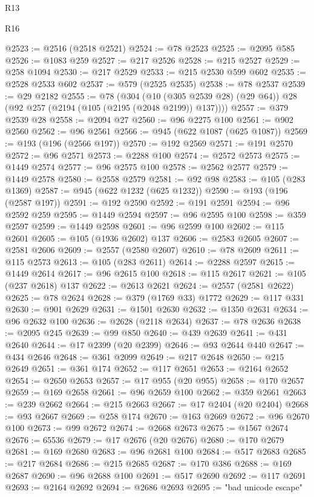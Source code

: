 \begin{lexlean}{R13}
\begin{lexlean}{R16}
\begin{coremodule}
{{{{{{{{{{{{{{{{{{{{{{{{{{{{{{{{{{{{{{{{{{{{{{{{{{{{{{{{{{{{{{{{{{{{{{{{{{{{{{{{{{{{{{{{{{{{{{{{{{{{{{{{{{{{{{{{{@2523 := @2516 (@2518 @2521)
@2524 := @78 @2523
@2525 := @2095 @585
@2526 := @1083 @259
@2527 := @217 @2526
@2528 := @215 @2527
@2529 := @258 @1094
@2530 := @217 @2529
@2533 := @215 @2530 @599 @602
@2535 := @2528 @2533 @602
@2537 := @579 (@2525 @2535)
@2538 := @78 @2537
@2539 := @29 @2182
@2555 := @78
    (@304 (@10 (@305 @2539 @28) (@29 @64)) @28 (@92 @257 (@2194 (@105 (@2195 (@2048 @2199)) @137))))
@2557 := @379 @2539 @28
@2558 := @2094 @27
@2560 := @96 @2275 @100
@2561 := @902 @2560
@2562 := @96 @2561
@2566 := @945 (@622 @1087 (@625 @1087))
@2569 := @193 (@196 (@2566 @197))
@2570 := @192 @2569
@2571 := @191 @2570
@2572 := @96 @2571
@2573 := @2288 @100
@2574 := @2572 @2573
@2575 := @1449 @2574
@2577 := @96 @2575 @100
@2578 := @2562 @2577
@2579 := @1449 @2578
@2580 := @2558 @2579
@2581 := @92 @98
@2583 := @105 (@283 @1369)
@2587 := @945 (@622 @1232 (@625 @1232))
@2590 := @193 (@196 (@2587 @197))
@2591 := @192 @2590
@2592 := @191 @2591
@2594 := @96 @2592 @259
@2595 := @1449 @2594
@2597 := @96 @2595 @100
@2598 := @359 @2597
@2599 := @1449 @2598
@2601 := @96 @2599 @100
@2602 := @115 @2601
@2605 := @105 (@1936 @2602) @137
@2606 := @2583 @2605
@2607 := @2581 @2606
@2609 := @2557 (@2580 @2607)
@2610 := @78 @2609
@2611 := @115 @2573
@2613 := @105 (@283 @2611)
@2614 := @2288 @2597
@2615 := @1449 @2614
@2617 := @96 @2615 @100
@2618 := @115 @2617
@2621 := @105 (@237 @2618) @137
@2622 := @2613 @2621
@2624 := @2557 (@2581 @2622)
@2625 := @78 @2624
@2628 := @379 (@1769 @33) @1772
@2629 := @117 @331
@2630 := @901 @2629
@2631 := @1501 @2630
@2632 := @1350 @2631
@2634 := @96 @2632 @100
@2636 := @2628 (@2118 @2634)
@2637 := @78 @2636
@2638 := @2095 @245
@2639 := @99 @850
@2640 := @439 @2639
@2641 := @431 @2640
@2644 := @17 @2399 (@20 @2399)
@2646 := @93 @2644 @440
@2647 := @434 @2646
@2648 := @361 @2099
@2649 := @217 @2648
@2650 := @215 @2649
@2651 := @361 @174
@2652 := @117 @2651
@2653 := @2164 @2652
@2654 := @2650 @2653
@2657 := @17 @955 (@20 @955)
@2658 := @170 @2657
@2659 := @169 @2658
@2661 := @96 @2659 @100
@2662 := @359 @2661
@2663 := @239 @2662
@2664 := @215 @2663
@2667 := @17 @2404 (@20 @2404)
@2668 := @93 @2667
@2669 := @258 @174
@2670 := @163 @2669
@2672 := @96 @2670 @100
@2673 := @99 @2672
@2674 := @2668 @2673
@2675 := @1567 @2674
@2676 := 65536
@2679 := @17 @2676 (@20 @2676)
@2680 := @170 @2679
@2681 := @169 @2680
@2683 := @96 @2681 @100
@2684 := @517 @2683
@2685 := @217 @2684
@2686 := @215 @2685
@2687 := @170 @386
@2688 := @169 @2687
@2690 := @96 @2688 @100
@2691 := @517 @2690
@2692 := @117 @2691
@2693 := @2164 @2692
@2694 := @2686 @2693
@2695 := "bad unicode escape"
}}}}}}}}}}}}}}}}}}}}}}}}}}}}}}}}}}}}}}}}}}}}}}}}}}}}}}}}}}}}}}}}}}}}}}}}}}}}}}}}}}}}}}}}}}}}}}}}}}}}}}}}}}}}}}}}}
\end{coremodule}
\end{lexlean}
\end{lexlean}

